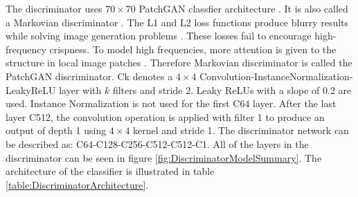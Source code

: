 The discriminator uses $70 \times 70$ PatchGAN classfier architecture \cite{isola2018imagetoimage}. It is also called a Markovian discriminator \cite{li2016precomputed}. The L1 and L2 loss functions produce blurry results while solving
image generation problems \cite{ledig2017photorealistic}. These losses fail to encourage high-frequency crispness. To model high frequencies, more attention is given to the structure in local image patches \cite{isola2018imagetoimage}. Therefore Markovian discriminator is called the PatchGAN discriminator. {\selectfont Ck} denotes a $4 \times 4$ Convolution-InstanceNormalization-LeakyReLU layer with $k$ filters and stride 2. Leaky ReLUs with a slope of 0.2 are used. Instance Normalization is not used for the first {\selectfont C64} layer. After the last layer {\selectfont C512}, the convolution operation is applied with filter 1 to produce an output of depth 1 using $4 \times 4$ kernel and stride 1. The discriminator network can be described as: {\selectfont C64-C128-C256-C512-C512-C1}. All of the layers in the discriminator can be seen in figure \ref{fig:DiscriminatorModelSummary}. The architecture of the classifier is illustrated in table \ref{table:DiscriminatorArchitecture}.





